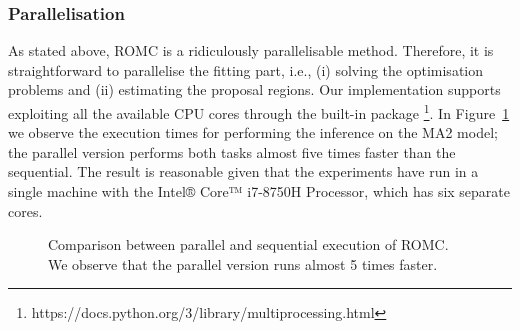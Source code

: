 \subsubsection*{Parallelisation}

As stated above, ROMC is a ridiculously parallelisable
method. Therefore, it is straightforward to parallelise the fitting
part, i.e., (i) solving the optimisation problems and (ii) estimating
the proposal regions. Our implementation supports exploiting all the
available CPU cores through the built-in  package
\footnote{https://docs.python.org/3/library/multiprocessing.html}. In
Figure~\ref{fig:exec_parallel} we observe the execution times for
performing the inference on the MA2 model; the parallel version
performs both tasks almost five times faster than the sequential. The
result is reasonable given that the experiments have run in a single
machine with the Intel® Core™ i7-8750H Processor, which has six
separate cores.


\begin{figure}[ht]
  \begin{center}
    \resizebox{.49\columnwidth}{!}{%
      
    }
    \resizebox{.49\columnwidth}{!}{%
      
    }
    \end{center}
    \caption[Execution time exploiting parallelisation]{Comparison
      between parallel and sequential execution of ROMC. We observe
      that the parallel version runs almost 5 times faster.}
      \label{fig:exec_parallel}
\end{figure}
